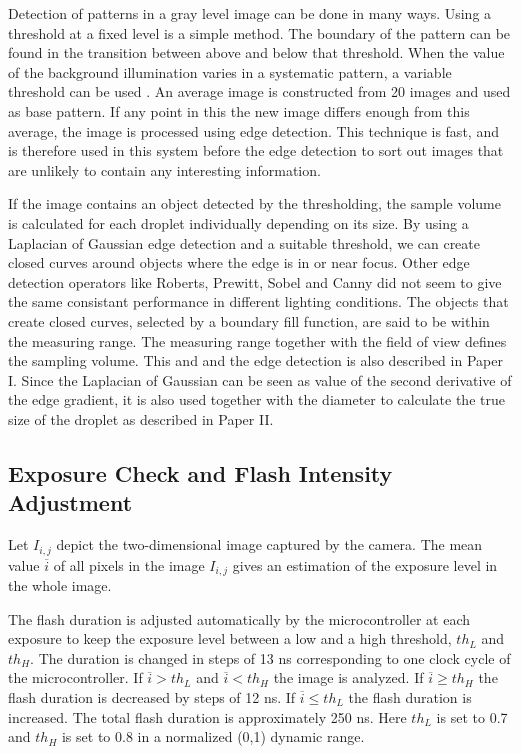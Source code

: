 Detection of patterns in a gray level image can be done in many ways. Using a threshold at a fixed level is a simple method. The boundary of the pattern can be found in the transition between above and below that threshold. When the value of the background illumination varies in a systematic pattern, a variable threshold can be used \cite{gonz2002}. An average image is constructed from 20 images and used as base pattern. If any point in this the new image differs enough from this average, the image is processed using edge detection. This technique is fast, and is therefore used in this system before the edge detection to sort out images that are unlikely to contain any interesting information.

If the image contains an object detected by the thresholding, the sample volume is calculated for each droplet individually depending on its size. By using a Laplacian of Gaussian \cite{marr1980, gonz2002} edge detection and a suitable threshold, we can create closed curves around objects where the edge is in or near focus. Other edge detection operators like Roberts, Prewitt, Sobel \cite{gonz2002} and Canny \cite{canny1986} did not seem to give the same consistant performance in different lighting conditions. The objects that create closed curves, selected by a boundary fill function, are said to be within the measuring range. The measuring range together with the field of view defines the sampling volume. This and and the edge detection is also described in Paper I. Since the Laplacian of Gaussian can be seen as value of the second derivative of the edge gradient, it is also used together with the diameter to calculate the true size of the droplet as described in Paper II.

\subsection{Exposure Check and Flash Intensity Adjustment}

Let $I_{i,j}$ depict the two-dimensional image captured by the camera. The mean value $\overline{i}$ of all pixels in the image $I_{i,j}$ gives an estimation of the exposure level in the whole image. 

The flash duration is adjusted automatically by the microcontroller at each exposure to keep the exposure level between a low and a high threshold, $th_L$ and $th_H$. The duration is changed in steps of 13 ns corresponding to one clock cycle of the microcontroller. If $\overline{i} > th_L$ and $\overline{i} < th_H$ the image is analyzed. If $\overline{i} \geq th_H$ the flash duration is decreased by steps of 12 ns. If $\overline{i} \leq th_L$ the flash duration is increased. The total flash duration is approximately 250 ns. Here $th_L$ is set to 0.7 and $th_H$ is set to 0.8 in a normalized (0,1) dynamic range.

